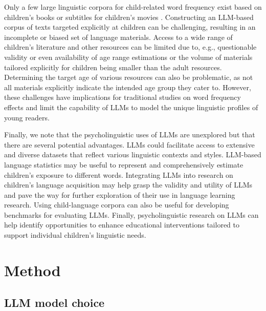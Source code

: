 \documentclass[jou, a4paper]{apa7}
\begin{document}
Only a few large linguistic corpora for child-related word frequency exist based on children's books or subtitles for children's movies \citep{schroeder_childlex_2015, tellings_basilex_2014, van_heuven_subtlex-uk_2014}. Constructing an LLM-based corpus of texts targeted explicitly at children can be challenging, resulting in an incomplete or biased set of language materials. Access to a wide range of children's literature and other resources can be limited due to, e.g., questionable validity or even availability of age range estimations or the volume of materials tailored explicitly for children being smaller than the adult resources. Determining the target age of various resources can also be problematic, as not all materials explicitly indicate the intended age group they cater to. However, these challenges have implications for traditional studies on word frequency effects and limit the capability of LLMs to model the unique linguistic profiles of young readers.

Finally, we note that the psycholinguistic uses of LLMs are unexplored but that there are several potential advantages. LLMs could facilitate access to extensive and diverse datasets that reflect various linguistic contexts and styles. LLM-based language statistics may be useful to represent and comprehensively estimate children's exposure to different words. Integrating LLMs into research on children's language acquisition may help grasp the validity and utility of LLMs and pave the way for further exploration of their use in language learning research. Using child-language corpora can also be useful for developing benchmarks for evaluating LLMs. Finally, psycholinguistic research on LLMs can help identify opportunities to enhance educational interventions tailored to support individual children's linguistic needs.  

\section{Method}
\subsection*{LLM model choice}
\end{document}
